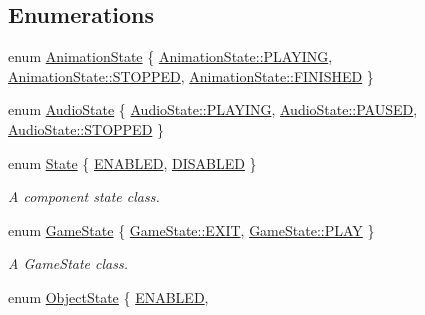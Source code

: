 \subsection*{Enumerations}
\begin{DoxyCompactItemize}
\item 
enum \hyperlink{namespaceengine_aa24807a1a7834d08efa99ae4672d3544}{Animation\+State} \{ \hyperlink{namespaceengine_aa24807a1a7834d08efa99ae4672d3544a50366a49630a416ab3ccaa004196027e}{Animation\+State\+::\+P\+L\+A\+Y\+I\+NG}, 
\hyperlink{namespaceengine_aa24807a1a7834d08efa99ae4672d3544a09d4d696b4e935115b9313e3c412509a}{Animation\+State\+::\+S\+T\+O\+P\+P\+ED}, 
\hyperlink{namespaceengine_aa24807a1a7834d08efa99ae4672d3544a2c616b2713e2e0aed04b4c4752c88133}{Animation\+State\+::\+F\+I\+N\+I\+S\+H\+ED}
 \}
\item 
enum \hyperlink{namespaceengine_a5de9278ae356d4ff4fe8864ebf683bc8}{Audio\+State} \{ \hyperlink{namespaceengine_a5de9278ae356d4ff4fe8864ebf683bc8a50366a49630a416ab3ccaa004196027e}{Audio\+State\+::\+P\+L\+A\+Y\+I\+NG}, 
\hyperlink{namespaceengine_a5de9278ae356d4ff4fe8864ebf683bc8a99b2439e63f73ad515f7ab2447a80673}{Audio\+State\+::\+P\+A\+U\+S\+ED}, 
\hyperlink{namespaceengine_a5de9278ae356d4ff4fe8864ebf683bc8a09d4d696b4e935115b9313e3c412509a}{Audio\+State\+::\+S\+T\+O\+P\+P\+ED}
 \}
\item 
enum \hyperlink{namespaceengine_aa1fd544a3408d033764aa448ec42c912}{State} \{ \hyperlink{namespaceengine_aae2fae4fa5de0d9b0accc1b59b6c2ff5ac8cf6eea8f096ed51160b484d97c5bbd}{E\+N\+A\+B\+L\+ED}, 
\hyperlink{namespaceengine_aae2fae4fa5de0d9b0accc1b59b6c2ff5a055c1a591abb0e8cd86dc969727bcc0b}{D\+I\+S\+A\+B\+L\+ED}
 \}\begin{DoxyCompactList}\small\item\em A component state class. \end{DoxyCompactList}
\item 
enum \hyperlink{namespaceengine_af41e517ae74e4a8447ff80a2abcaf8dd}{Game\+State} \{ \hyperlink{namespaceengine_af41e517ae74e4a8447ff80a2abcaf8ddaa42b2fb0e720a080e79a92f4ca97d927}{Game\+State\+::\+E\+X\+IT}, 
\hyperlink{namespaceengine_af41e517ae74e4a8447ff80a2abcaf8dda6a216efc529825c60a4a4c0bc99ad77f}{Game\+State\+::\+P\+L\+AY}
 \}\begin{DoxyCompactList}\small\item\em A Game\+State class. \end{DoxyCompactList}
\item 
enum \hyperlink{namespaceengine_aae2fae4fa5de0d9b0accc1b59b6c2ff5}{Object\+State} \{ \hyperlink{namespaceengine_aae2fae4fa5de0d9b0accc1b59b6c2ff5a68e59a9d9cdcf64ecd1ba4bae103ab16}{E\+N\+A\+B\+L\+ED}, 

\end{DoxyCompactItemize}

